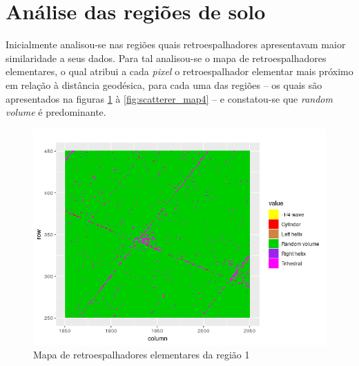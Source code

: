 \documentclass[12pt]{article}
\begin{document}
\section{Análise das regiões de solo}

Inicialmente analisou-se nas regiões quais retroespalhadores apresentavam maior similaridade a seus dados. Para tal analisou-se o mapa de retroespalhadores elementares, o qual atribui a cada \textit{pixel} o retroespalhador elementar mais próximo em relação à distância geodésica, para cada uma das regiões -- os quais são apresentados na figuras \ref{fig:scatterer_map1} à \ref{fig:scatterer_map4} -- e constatou-se que \textit{random volume} é predominante.

\begin{figure}[!h]

  \centering
  \includegraphics[width=\linewidth]{../../Images/Report_19_02_27/scatterer_map_region1.png}
  \caption{Mapa de retroespalhadores elementares da região 1}
  \label{fig:scatterer_map1}

\end{figure}
\end{document}

